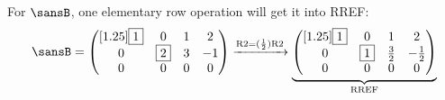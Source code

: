 \documentclass[12 pt]{article}
\newcommand{\pmat}[1]{\begin{pmatrix}[1.25]#1\end{pmatrix}}
\begin{document}
\noindent For $\sansB$, one elementary row operation will get it into RREF:
\[
\sansB=\pmat{\fbox{1} & 0 & 1 & 2 \\ 0 & \fbox{2} & 3 & -1 \\ 0 & 0 & 0 & 0}
\xrightarrow{\text{R2}=(\frac{1}{2})\text{R2}}
\underbrace{\pmat{\fbox{1} & 0 & 1 & 2 \\ 0 & \fbox{1} & \frac{3}{2} & -\frac{1}{2} \\ 0 & 0 & 0 & 0}}_{\text{RREF}}
\]
\end{document}
